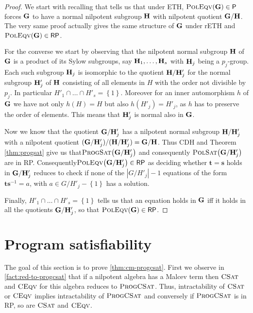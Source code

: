 \documentclass[11pt,a4paper]{amsart}
\newcommand{\polsat}[1]{\textsc{PolSat}\left( {\m #1} \right)}
\newcommand{\ptime}{\textsf{P}\xspace}
\newcommand{\rptime}{\textsf{RP}\xspace}
\newcommand{\m}[1]{{\uppercase {\bf{#1}}}}
\newcommand{\set}[1]{{\left\{ {#1} \right\} }}
\newcommand{\card}[1]{\left| #1 \right|}
\newcommand{\po}[1]{{\mathbf {#1}}}
\newcommand{\gProblem}[2]{\ensuremath{\operatorname{\textup{\textsc{{#2}}}}
		\ifthenelse{\equal{#1}{}}{}{\!\left( {#1} \right)}}}
\renewcommand{\polsat}[1]{\gProblem{#1}{PolSat}}
\newcommand{\poleqv}[1]{\gProblem{#1}{PolEqv}}
\newcommand{\ceqv}[1]{\gProblem{#1}{CEqv}}
\newcommand{\csat}[1]{\gProblem{#1}{CSat}}
\newcommand{\progpolsat}[1]{\gProblem{#1}{ProgSat}}
\newcommand{\progcsat}[1]{\gProblem{#1}{ProgCSat}}
\newcommand{\setm}{-}
\newcommand{\cdhh}{CDH\xspace}
\newcommand{\ethh}{ETH\xspace}
\newcommand{\rethh}{rETH\xspace}
\begin{document}
\begin{proof}
We start with recalling that \cite[Theorem 1]{IdziakKKW22TOCS} tells us that under \ethh,
$\poleqv{\m G} \in \ptime$ forces $\m G$ to have a normal nilpotent subgroup $\m H$
with nilpotent quotient $\m G/\m H$.
The very same proof actually gives the same structure of $\m G$ under
\rethh and $\poleqv{\m G} \in \rptime$.


For the converse we start by observing that
the nilpotent normal subgroup $\m H$ of $\m G$ is a product of its Sylow subgroups,
say $\m H_1,\ldots,\m H_s$ with $\m H_j$ being a $p_j$-group.
Each such subgroup $\m H_j$ is isomorphic to the quotient $\m H/\m H'_j$
for the normal subgroup $\m H'_j$ of $\m H$ consisting of all elements in $H$
with the order not divisible by $p_j$.
In particular $H'_1\cap\ldots\cap H'_s=\set{1}$.
Moreover for an inner automorphism $h$ of $\m G$ we have not only $h(H)=H$
but also $h(H'_j)=H'_j$, as $h$ has to preserve the order of elements.
This means that $\m H'_j$ is normal also in $\m G$.

Now we know that the quotient $\m G/\m H'_j$ has a nilpotent normal subgroup $\m H/\m H'_j$
with a nilpotent quotient $(\m G/\m H'_j)/(\m H/\m H'_j)=\m G/\m H$.
Thus \cdhh and Theorem \ref{thm:progsat} give us that\break $\progpolsat{\m G/\m H'_j}$ and consequently $\polsat{\m G/\m H'_j}$  are in \rptime.
Consequently\break $\poleqv{\m G/\m H'_j}\in \rptime$ as deciding whether $\po t=\po s$ holds in
$\m G/\m H'_j$ reduces to check if none of the $\card{G/H'_j}-1$ equations of the form $\po t\po s^{-1}=a$,
with $a\in G/H'_j\setm\set{1}$ has a solution.

Finally, $H'_1\cap\ldots\cap H'_s=\set{1}$ tells us that an equation holds in $\m G$
iff it holds in all the quotients $\m G/\m H'_j$, so that
$\poleqv{\m G}\in\rptime$.
\end{proof}

\section{Program satisfiability}
\label{section:progcsat}
The goal of this section is to prove \cref{thm:cm-progcsat}. First we observe in \cref{fact:red-to-progcsat} that if a nilpotent algebra has a Malcev term then \csat{} and \ceqv{} for this algebra reduces to \progcsat{}. Thus, intractability of \csat{} or \ceqv{} implies intractability of \progcsat{} and conversely if \progcsat{} is in \rptime, so are \csat{} and \ceqv{}.
\end{document}
